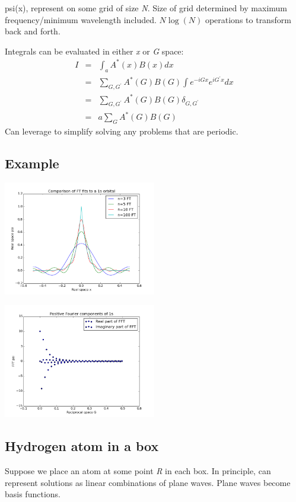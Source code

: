 \documentclass[11pt]{article}
\begin{document}
psi(x)\), represent on some grid of size \emph{N}.  Size of grid determined by maximum frequency/minimum wavelength included.  \(N\log(N)\) operations to transform back and forth.

Integrals can be evaluated in either \emph{x} or \emph{G} space:
\begin{eqnarray}
I & = & \int_a A^*(x) B(x) d x \\
  & = & \sum_{G,G^\prime} A^*(G) B(G) \int e^{-iGx}e^{iG^\prime x} dx \\
  & = & \sum_{G,G^\prime} A^*(G) B(G) \delta_{G,G^\prime} \\
  & = & a \sum_G A^*(G) B(G)
\end{eqnarray}
Can leverage to simplify solving any problems that are periodic.

\subsection{Example}
\label{sec:org2207bdf}
\begin{center}
\includegraphics[width=0.5\textwidth]{./Images/real.png}
\end{center}   \begin{center}
\includegraphics[width=0.5\textwidth]{./Images/fft.png}
\end{center}

\subsection{Hydrogen atom in a box}
\label{sec:org3bd0566}
Suppose we place an atom at some point \emph{R} in each box.  In principle, can  represent solutions as linear combinations of plane waves.  Plane waves become basis functions. 
\end{document}
